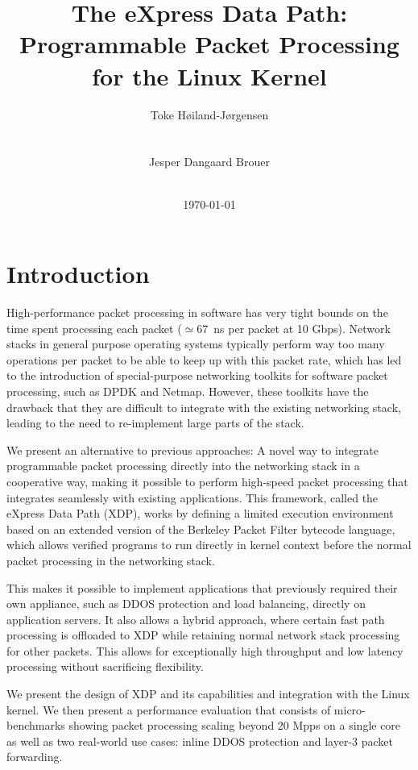 \documentclass[10pt]{sig-alternate-05-2015}
\author{
\alignauthor
Toke Høiland-Jørgensen\\
       \affaddr{Dept of Computer Science}\\
       \affaddr{Karlstad University, Sweden}\\
       \email{toke.hoiland-jorgensen@kau.se}
\alignauthor
Jesper Dangaard Brouer\\
       \affaddr{Red Hat}\\
       \email{brouer@redhat.com}}
\date{\today}
\title{The eXpress Data Path: Programmable Packet Processing for the Linux Kernel}
\begin{document}

\maketitle

\section{Introduction}
\label{sec:introduction}
High-performance packet processing in software has very tight bounds on the time
spent processing each packet ($\simeq67$~ns per packet at 10 Gbps). Network
stacks in general purpose operating systems typically perform way too many
operations per packet to be able to keep up with this packet rate, which has led
to the introduction of special-purpose networking toolkits for software packet
processing, such as DPDK and Netmap. However, these toolkits have the drawback
that they are difficult to integrate with the existing networking stack, leading
to the need to re-implement large parts of the stack.

We present an alternative to previous approaches: A novel way to integrate
programmable packet processing directly into the networking stack in a
cooperative way, making it possible to perform high-speed packet processing that
integrates seamlessly with existing applications. This framework, called the
eXpress Data Path (XDP), works by defining a limited execution environment based
on an extended version of the Berkeley Packet Filter bytecode language, which
allows verified programs to run directly in kernel context before the normal
packet processing in the networking stack.

This makes it possible to implement applications that previously required their
own appliance, such as DDOS protection and load balancing, directly on
application servers. It also allows a hybrid approach, where certain fast path
processing is offloaded to XDP while retaining normal network stack processing
for other packets. This allows for exceptionally high throughput and low latency
processing without sacrificing flexibility.

We present the design of XDP and its capabilities and integration with the Linux
kernel. We then present a performance evaluation that consists of
micro-benchmarks showing packet processing scaling beyond 20 Mpps on a single
core as well as two real-world use cases: inline DDOS protection and layer-3
packet forwarding.
\end{document}
